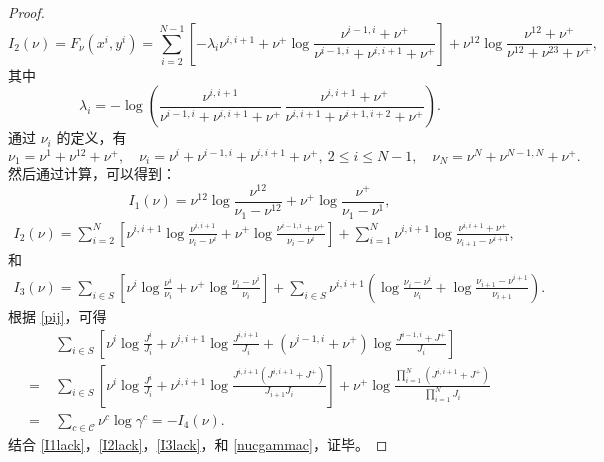 \begin{appendices}
\begin{proof}
	\begin{equation*}
		I_2(\nu)=F_{\nu}(x^i,y^i)=\sum_{i=2}^{N-1}\left[-\lambda_{i}\nu^{i,i+1}+\nu^+\log\frac{\nu^{i-1,i}+\nu^+}{\nu^{i-1,i}+\nu^{i,i+1}+\nu^+}\right]+\nu^{12}\log\frac{\nu^{12}+\nu^+}{\nu^{12}+\nu^{23}+\nu^+},
	\end{equation*}
	其中 
	\begin{equation*}
		\lambda_i=-\log\left(\frac{\nu^{i,i+1}}{\nu^{i-1,i}+\nu^{i,i+1}+\nu^+}\,\frac{\nu^{i,i+1}+\nu^+}{\nu^{i,i+1}+\nu^{i+1,i+2}+\nu^+}\right).
	\end{equation*}
	通过 $\nu_i$ 的定义，有
	\begin{equation*}
		\nu_1=\nu^{1}+\nu^{12}+\nu^+,\quad \nu_i=\nu^i+\nu^{i-1,i}+\nu^{i,i+1}+\nu^+,\ 2\le i\le N-1,\quad \nu_N=\nu^N+\nu^{N-1,N}+\nu^+.
	\end{equation*} 
然后通过计算，可以得到：	
\begin{equation}\label{I1lack}
	I_1(\nu)=\nu^{12}\log\frac{\nu^{12}}{\nu_1-\nu^{12}}+\nu^+\log\frac{\nu^+}{\nu_1-\nu^1},
\end{equation}
	\begin{align}\label{I2lack}
	I_2(\nu)
	=\sum_{i=2}^{N}\left[\nu^{i,i+1}\log\frac{\nu^{i,i+1}}{\nu_i-\nu^i}+\nu^+\log\frac{\nu^{i-1,i}+\nu^+}{\nu_i-\nu^i}\right]+\sum_{i=1}^{N}\nu^{i,i+1}\log\frac{\nu^{i,i+1}+\nu^+}{\nu_{i+1}-\nu^{i+1}},
   \end{align}
和
	\begin{equation}\label{I3lack}
		\begin{split}
			I_3(\nu)=\sum_{i\in S}\left[\nu^i\log\frac{\nu^i}{\nu_i}+\nu^+\log\frac{\nu_i-\nu^i}{\nu_i}\right]+\sum_{i\in S}\nu^{i,i+1}\left(\log\frac{\nu_i-\nu^i}{\nu_i}
			+\log\frac{\nu_{i+1}-\nu^{i+1}}{\nu_{i+1}}\right).
		\end{split}
	\end{equation}
    根据 \eqref{pij}，可得
	\begin{equation}\label{nucgammac}
		\begin{split}
			&\;\sum_{i \in S}\left[\nu^i\log\frac{J^i}{J_i}+\nu^{i,i+1}\log\frac{J^{i,i+1}}{J_i}+(\nu^{i-1,i}+\nu^+)\log\frac{J^{i-1,i}+J^+}{J_i}\right]\\
			=&\;\sum_{i \in S}\left[\nu^i\log\frac{J^i}{J_i}+\nu^{i,i+1}\log\frac{J^{i,i+1}(J^{i,i+1}+J^+)}{J_{i+1}J_i}\right]+\nu^+\log\frac{\prod_{i=1}^N\left(J^{i,i+1}+J^+\right)}{\prod_{i=1}^N J_i}\\
			=&\;\sum_{c \in \mathcal{C}}\nu^c \log\gamma^c=-I_4(\nu).
		\end{split}
	\end{equation}
	结合 \eqref{I1lack}，\eqref{I2lack}，\eqref{I3lack}，和 \eqref{nucgammac}，证毕。
\end{proof}


\end{appendices}
